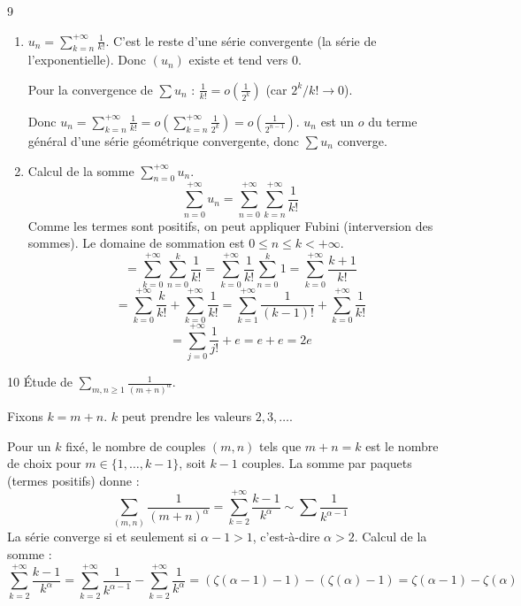 \begin{correction}{9}
\begin{enumerate}
    \item 
        $u_n = \sum_{k=n}^{+ \infty} \frac{1}{k!}$. C'est le reste d'une série convergente (la série de l'exponentielle). Donc $(u_n)$ existe et tend vers 0.
    
        Pour la convergence de $\sum u_n$ :
        $\frac{1}{k!} = o\left(\frac{1}{2^k}\right)$ (car $2^k/k! \to 0$).
        
        Donc $\displaystyle u_n = \sum_{k=n}^{+\infty} \frac{1}{k!} = o \left(\sum_{k=n}^{+\infty} \frac{1}{2^k} \right) = o \left(\frac{1}{2^{n-1}}\right)$.
        $u_n$ est un $o$ du terme général d'une série géométrique convergente, donc $\sum u_n$ converge.

    \item Calcul de la somme $\sum_{n=0}^{+ \infty} u_n$.
        $$ \sum_{n=0}^{+\infty} u_n = \sum_{n=0}^{+\infty} \sum_{k=n}^{+\infty} \frac{1}{k!} $$
        Comme les termes sont positifs, on peut appliquer Fubini (interversion des sommes).
        Le domaine de sommation est $0 \leqslant n \leqslant k < +\infty$.
        $$ = \sum_{k=0}^{+\infty} \sum_{n=0}^k \frac{1}{k!} = \sum_{k=0}^{+\infty} \frac{1}{k!} \sum_{n=0}^k 1 = \sum_{k=0}^{+\infty} \frac{k+1}{k!} $$
        $$ = \sum_{k=0}^{+\infty} \frac{k}{k!} + \sum_{k=0}^{+\infty} \frac{1}{k!} = \sum_{k=1}^{+\infty} \frac{1}{(k-1)!} + \sum_{k=0}^{+\infty} \frac{1}{k!} $$
        $$ = \sum_{j=0}^{+\infty} \frac{1}{j!} + e = e + e = 2e $$
\end{enumerate}
\end{correction}

\begin{correction}{10}
    Étude de $\sum_{m,n \ge 1} \frac{1}{(m+n)^\alpha}$.

    Fixons $k = m+n$. $k$ peut prendre les valeurs $2, 3, \dots$.

    Pour un $k$ fixé, le nombre de couples $(m,n)$ tels que $m+n=k$ est le nombre de choix pour $m \in \{1, \dots, k-1\}$, soit $k-1$ couples.
    La somme par paquets (termes positifs) donne :
    $$ \sum_{(m,n)} \frac{1}{(m+n)^\alpha} = \sum_{k=2}^{+\infty} \frac{k-1}{k^\alpha} \sim \sum \frac{1}{k^{\alpha-1}} $$
    La série converge si et seulement si $\alpha-1 > 1$, c'est-à-dire $\alpha > 2$.
    Calcul de la somme :
    $$ \sum_{k=2}^{+\infty} \frac{k-1}{k^\alpha} = \sum_{k=2}^{+\infty} \frac{1}{k^{\alpha-1}} - \sum_{k=2}^{+\infty} \frac{1}{k^\alpha} = (\zeta(\alpha-1)-1) - (\zeta(\alpha)-1) = \zeta(\alpha-1) - \zeta(\alpha) $$
\end{correction}

